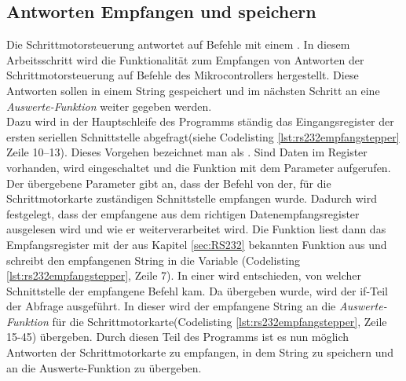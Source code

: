 \subsection{Antworten Empfangen und speichern}
\label{sec:Empfangen_Schrittmotor}
Die Schrittmotorsteuerung antwortet auf Befehle mit einem . In diesem Arbeitsschritt wird die Funktionalität zum Empfangen von Antworten der Schrittmotorsteuerung auf Befehle des Mikrocontrollers hergestellt. Diese Antworten sollen in einem String gespeichert und im nächsten Schritt an eine \emph{Auswerte-Funktion} weiter gegeben werden.\\
Dazu wird in der Hauptschleife des Programms ständig das Eingangsregister der ersten seriellen Schnittstelle abgefragt(siehe Codelisting \ref{lst:rs232empfangstepper} Zeile 10--13). Dieses Vorgehen bezeichnet man als .
Sind Daten im Register vorhanden, wird  eingeschaltet und die Funktion  mit dem Parameter  aufgerufen. Der übergebene Parameter gibt an, dass der Befehl von der, für die Schrittmotorkarte zuständigen Schnittstelle empfangen wurde. Dadurch wird festgelegt, dass der empfangene  aus dem richtigen Datenempfangsregister ausgelesen wird und wie er weiterverarbeitet wird. Die Funktion  liest dann das Empfangsregister mit der aus Kapitel \ref{sec:RS232} bekannten Funktion  aus und schreibt den empfangenen String in die Variable (Codelisting \ref{lst:rs232empfangstepper}, Zeile 7). In einer  wird entschieden, von welcher Schnittstelle der empfangene Befehl kam. Da  übergeben wurde, wird der if-Teil der Abfrage ausgeführt. In dieser wird der empfangene String an die \emph{Auswerte-Funktion} für die Schrittmotorkarte(Codelisting \ref{lst:rs232empfangstepper}, Zeile 15-45) übergeben.
Durch diesen Teil des Programms ist es nun möglich Antworten der Schrittmotorkarte zu empfangen, in dem String  zu speichern und an die Auswerte-Funktion  zu übergeben.
\lstset{language=C, basicstyle=\footnotesize, showstringspaces=false, tabsize=8}



